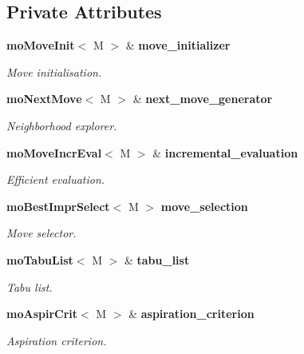 \subsection*{Private Attributes}
\begin{CompactItemize}
\item 
{\bf mo\-Move\-Init}$<$ M $>$ \& {\bf move\_\-initializer}\label{classmo_t_s_move_loop_expl_r0}

\begin{CompactList}\small\item\em Move initialisation. \item\end{CompactList}\item 
{\bf mo\-Next\-Move}$<$ M $>$ \& {\bf next\_\-move\_\-generator}\label{classmo_t_s_move_loop_expl_r1}

\begin{CompactList}\small\item\em Neighborhood explorer. \item\end{CompactList}\item 
{\bf mo\-Move\-Incr\-Eval}$<$ M $>$ \& {\bf incremental\_\-evaluation}\label{classmo_t_s_move_loop_expl_r2}

\begin{CompactList}\small\item\em Efficient evaluation. \item\end{CompactList}\item 
{\bf mo\-Best\-Impr\-Select}$<$ M $>$ {\bf move\_\-selection}\label{classmo_t_s_move_loop_expl_r3}

\begin{CompactList}\small\item\em Move selector. \item\end{CompactList}\item 
{\bf mo\-Tabu\-List}$<$ M $>$ \& {\bf tabu\_\-list}\label{classmo_t_s_move_loop_expl_r4}

\begin{CompactList}\small\item\em Tabu list. \item\end{CompactList}\item 
{\bf mo\-Aspir\-Crit}$<$ M $>$ \& {\bf aspiration\_\-criterion}\label{classmo_t_s_move_loop_expl_r5}

\begin{CompactList}\small\item\em Aspiration criterion. \item\end{CompactList}\end{CompactItemize}


